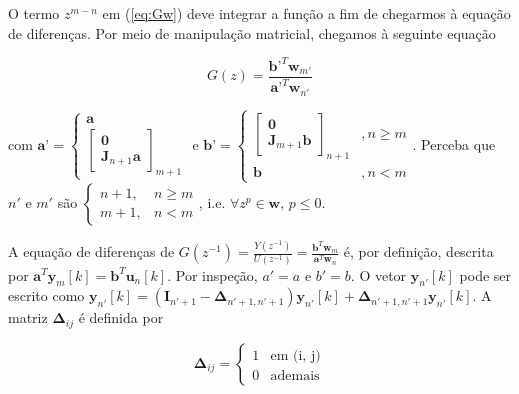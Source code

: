 \documentclass[twoside, fleqn]{article}
\begin{document}
    O termo $z^{m-n}$ em (\ref{eq:Gw}) deve integrar a função a fim de chegarmos à equação de diferenças. Por meio de manipulação matricial, chegamos à seguinte equação 
    
        \begin{equation}
            G(z) = \frac{\textbf{b'}^T \textbf{w}_{m'}}{\textbf{a'}^T \textbf{w}_{n'}}
            \label{eq:Gw}
        \end{equation}
    
    com $\textbf{a'} = \begin{cases} \textbf{a}\\ \begin{bmatrix} \textbf{0} \\ \textbf{J}_{n+1} \textbf{a} \end{bmatrix}_{m+1} \end{cases} \mbox{ e } \textbf{b'} = \begin{cases} \begin{bmatrix} \textbf{0}\\ \textbf{J}_{m+1} \textbf{b} \end{bmatrix}_{n+1} &, n \geq m \\ \textbf{b} &,  n < m \end{cases}$. Perceba que $n'$ e $m'$ são $\begin{cases} n + 1,& n \geq m \\ m + 1, & n < m \end{cases}$, i.e. $\forall z^p \in \textbf{w} \mbox{, } p \leq 0$. 
    
    A equação de diferenças de $G(z^{-1}) = \frac{Y(z^{-1})}{U(z^{-1})} = \frac{\textbf{b}^T \textbf{w}_{m}}{\textbf{a}^T \textbf{w}_{n}}$ é, por definição, descrita por $\textbf{a}^T \textbf{y}_{m}[k] = \textbf{b}^T \textbf{u}_{n}[k]$. Por inspeção, $a' = a$ e $b' = b$. O vetor $\textbf{y}_{n'}[k]$ pode ser escrito como $\textbf{y}_{n'}[k] = \left(\textbf{I}_{n' + 1} - \mathbf{\Delta}_{n'+1, n'+1}\right) \mathbf{y}_{n'}[k] + \mathbf{\Delta}_{n'+1, n'+1} \mathbf{y}_{n'}[k]$. A matriz $\mathbf{\Delta}_{ij}$ é definida por 
    
        \begin{equation}
          \mathbf{\Delta}_{ij} = 
          \begin{cases}
               1 & \mbox{em (i, j)}\\
               0 & \mbox{ademais}
          \end{cases}
        \end{equation}
    
\end{document}
